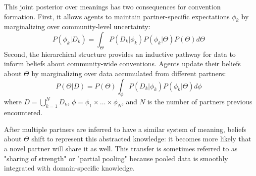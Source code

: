 This joint posterior over meanings has two consequences for convention formation.
First, it allows agents to maintain partner-specific expectations $\phi_k$ by marginalizing over community-level uncertainty:
\begin{equation}
P(\phi_k | D_k) = \int_{\Theta}P(D_k | \phi_k) P(\phi_k | \Theta) P(\Theta)  d\Theta
\end{equation}
Second, the hierarchical structure provides an inductive pathway for data to inform beliefs about community-wide conventions.
Agents update their beliefs about $\Theta$ by marginalizing over data accumulated from different partners:
\begin{equation}
P(\Theta | D) = P(\Theta) \int_{\phi} P(D_k | \phi_k) P(\phi_k | \Theta) d\phi
\end{equation}
where $D = \bigcup_{k=1}^N D_k$, $\phi = \phi_1 \times \dots \times \phi_N$, and $N$ is the number of partners previous encountered. 

After multiple partners are inferred to have a similar system of meaning, beliefs about $\Theta$ shift to represent this abstracted knowledge: it becomes more likely that a novel partner will share it as well.
This transfer is sometimes referred to as "sharing of strength" or "partial pooling" because pooled data is smoothly integrated with domain-specific knowledge.
